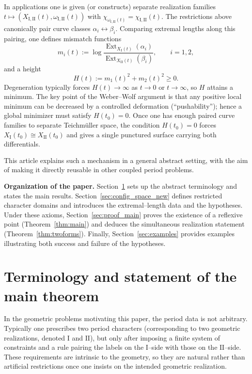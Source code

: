 \documentclass[a4paper,12pt]{amsart}
\DeclareMathOperator{\Ext}{Ext}
\theoremstyle{plain}
\theoremstyle{definition}
\begin{document}
In applications one is given (or constructs) separate realization families $t\longmapsto (X_{\mathrm{I, II}}(t),\omega_{\mathrm{I, II}}(t))$ with
$\chi_{\omega_{\mathrm{I, II}}(t)}=\chi_{\mathrm{I, II}}(t)$.
The restrictions above canonically pair curve classes $\alpha_i\leftrightarrow \beta_i$.
Comparing extremal lengths along this pairing, one defines mismatch functions
\[
m_i(t):=\log\frac{\Ext_{X_{\mathrm{I}}(t)}(\alpha_i)}{\Ext_{X_{\mathrm{II}}(t)}(\beta_i)},\qquad i=1,2,
\]
and a height
\[
H(t):=m_1(t)^2+m_2(t)^2\ge 0 .
\]
Degeneration typically forces $H(t)\longrightarrow\infty$ as $t\longrightarrow 0$ or $t\longrightarrow\infty$, so $H$ attains a minimum.
The key point of the Weber--Wolf argument is that any positive local minimum can be decreased by a controlled deformation (``pushability'');
hence a global minimizer must satisfy $H(t_0)=0$.
Once one has enough paired curve families to separate Teichm\"uller space, the condition $H(t_0)=0$ forces
$X_{\mathrm{I}}(t_0)\cong X_{\mathrm{II}}(t_0)$ and gives a single punctured surface carrying both differentials.

This article explains such a mechanism in a general abstract setting, with the aim of making it directly reusable in other coupled period problems.

\medskip
\noindent\textbf{Organization of the paper.}
Section~\ref{sec:terminology} sets up the abstract terminology and states the main results.
Section~\ref{sec:config_space_new} defines restricted character domains and introduces the extremal--length data and the  hypotheses.
Under these axioms, Section~\ref{sec:proof_main} proves the existence of a reflexive point (Theorem~\ref{thm:main}) and deduces the simultaneous
realization statement (Theorem~\ref{thm:twoforms}).
Finally, Section~\ref{sec:examples} provides examples illustrating both success and failure of the hypotheses.

\section{Terminology and statement of the main theorem}\label{sec:terminology}
In the geometric problems motivating this paper, the period data is not arbitrary.
Typically one prescribes two period characters (corresponding to two geometric realizations, denoted $\mathrm{I}$ and $\mathrm{II}$),
but only after imposing a finite system of constraints
and a rule pairing the labels on the $\mathrm{I}$--side with those on the $\mathrm{II}$--side.
These requirements are intrinsic to the geometry,
so they are natural rather than artificial restrictions once one insists on the intended geometric realization.
\end{document}
